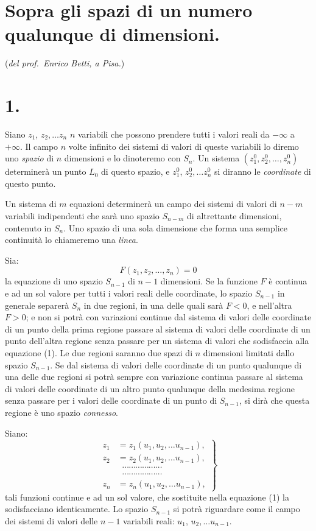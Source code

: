 \documentclass{article}
\begin{document}
\section*{Sopra gli spazi di un numero qualunque di dimensioni.}

(\emph{del prof.\ Enrico Betti, a Pisa.})

\section*{1.}

Siano $z_{1}$, $z_{2},\ldots z_{n}$ $n$ variabili che possono prendere tutti i valori reali da $-\infty$ a $+\infty$. Il campo $n$ volte infinito dei sistemi di valori di queste variabili lo diremo uno \emph{spazio} di $n$ dimensioni e lo dinoteremo con $S_{n}$. Un sistema $(z_{1}^{0}, z_{2}^{0},\ldots, z_{n}^{0})$ determinerà un punto $L_{0}$ di questo spazio, e $z_{1}^{0}$, $z_{2}^{0},\ldots z_{n}^{0}$ si diranno le \emph{coordinate} di questo punto.

Un sistema di $m$ equazioni determinerà un campo dei sistemi di valori di $n-m$ variabili indipendenti che sarà uno spazio $S_{n-m}$ di altrettante dimensioni, contenuto in $S_{n}$. Uno spazio di una sola dimensione che forma una semplice continuità lo chiameremo una \emph{linea}.

Sia:
\[ F(z_{1}, z_{2},\ldots, z_{n}) = 0 \tag{1} \]
la equazione di uno spazio $S_{n-1}$ di $n-1$ dimensioni. Se la funzione $F$ è continua e ad un sol valore per tutti i valori reali delle coordinate, lo spazio $S_{n-1}$ in generale separerà $S_{n}$ in due regioni, in una delle quali sarà $F < 0$, e nell'altra $F > 0$; e non si potrà con variazioni continue dal sistema di valori delle coordinate di un punto della prima regione passare al sistema di valori delle coordinate di un punto dell'altra regione senza passare per un sistema di valori che sodisfaccia alla equazione (1). Le due regioni saranno due spazi di $n$ dimensioni limitati dallo spazio $S_{n-1}$. Se dal sistema di valori delle coordinate di un punto qualunque di una delle due regioni si potrà sempre con variazione continua passare al sistema di valori delle coordinate di un altro punto qualunque della medesima regione senza passare per i valori delle coordinate di un punto di $S_{n-1}$, si dirà che questa regione è uno spazio \emph{connesso}.


Siano:
\[
\left.
\begin{aligned}
z_{1} &= z_{1}(u_{1}, u_{2},\ldots u_{n-1}),\\
z_{2} &= z_{2}(u_{1}, u_{2},\ldots u_{n-1}),\\
&\;\;\cdots\cdots\cdots\cdots\cdots\cdots\\
&\;\;\cdots\cdots\cdots\cdots\cdots\cdots\\
z_{n} &= z_{n}(u_{1}, u_{2},\ldots u_{n-1}),
\end{aligned}
\right\}
\tag{2}
\]
tali funzioni continue e ad un sol valore, che sostituite nella equazione (1) la sodisfacciano identicamente. Lo spazio $S_{n-1}$ si potrà riguardare come il campo dei sistemi di valori delle $n-1$ variabili reali: $u_{1}$, $u_{2},\ldots u_{n-1}$.
\end{document}
